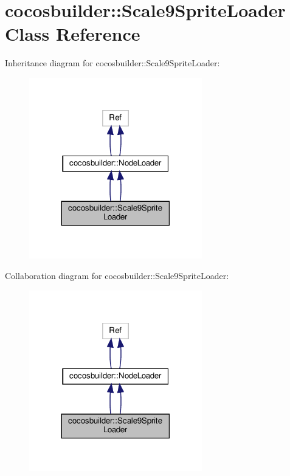 \hypertarget{classcocosbuilder_1_1Scale9SpriteLoader}{}\section{cocosbuilder\+:\+:Scale9\+Sprite\+Loader Class Reference}
\label{classcocosbuilder_1_1Scale9SpriteLoader}


Inheritance diagram for cocosbuilder\+:\+:Scale9\+Sprite\+Loader\+:
\nopagebreak
\begin{figure}[H]
\begin{center}
\leavevmode
\includegraphics[width=213pt]{classcocosbuilder_1_1Scale9SpriteLoader__inherit__graph}
\end{center}
\end{figure}


Collaboration diagram for cocosbuilder\+:\+:Scale9\+Sprite\+Loader\+:
\nopagebreak
\begin{figure}[H]
\begin{center}
\leavevmode
\includegraphics[width=213pt]{classcocosbuilder_1_1Scale9SpriteLoader__coll__graph}
\end{center}
\end{figure}

